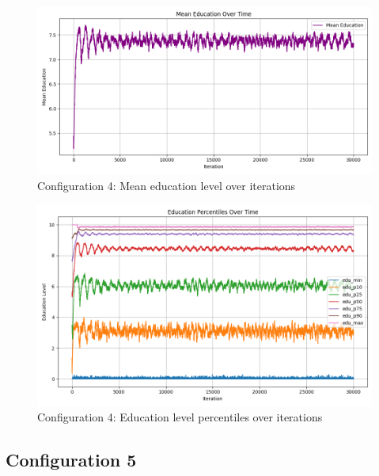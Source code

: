 \documentclass[english]{projectreport}
\begin{document}
    \begin{figure}[H]
        \centering
        \includegraphics[width=0.8\linewidth]{metrics_config4/metrics_config4_mean_education.png}
        \caption{Configuration 4: Mean education level over iterations}
        \label{fig:c0-mean_education}
    \end{figure}

    \begin{figure}[H]
        \centering
        \includegraphics[width=0.8\linewidth]{metrics_config4/metrics_config4_education_perc_time.png}
        \caption{Configuration 4: Education level percentiles over iterations}
        \label{fig:c0-education_perc_time}
    \end{figure}

\subsection*{Configuration 5}
\end{document}
